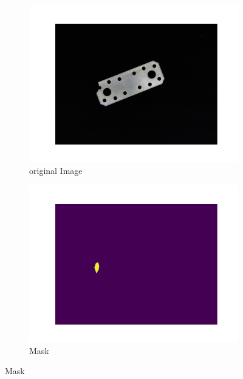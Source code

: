 \begin{figure}[htbp]
    \captionsetup[subfigure]{justification=centering}
    \centering
    \begin{subfigure}[b]{0.3\textwidth}
        \centering
        \includegraphics[width=\textwidth]{figures/pca_results/cut_corner.png}
        \caption*{original Image}

    \end{subfigure}
    \begin{subfigure}[b]{0.3\textwidth}
        \centering
        \includegraphics[width=\textwidth]{figures/pca_results/cut_corner_mask.png}
        \caption*{Mask}


\end{subfigure}
\end{figure}
